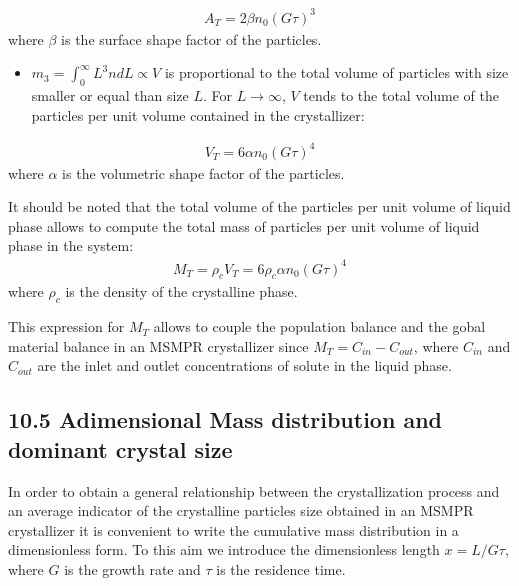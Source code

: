 \documentclass[letterpaper,10pt,english]{jupyterBook}
\begin{document}
\begin{equation}\label{equation:MSMPR_crystallizer:MSMPReq15}
\begin{split}
A_T=2{\beta}n_0(G\tau)^3
\end{split}
\end{equation}
\sphinxAtStartPar
where \(\beta\) is the surface shape factor of the particles.
\begin{itemize}
\item {} 
\sphinxAtStartPar
\(m_3=\int_0^{\infty}L^3ndL\propto{V}\) is proportional to the total volume of particles with size smaller or equal than size \(L\). For \(L\rightarrow{\infty}\), \(V\) tends to the total volume of the particles per unit volume contained in the crystallizer:

\end{itemize}
\begin{equation}\label{equation:MSMPR_crystallizer:MSMPReq16}
\begin{split}
V_T=6{\alpha}n_0(G\tau)^4
\end{split}
\end{equation}
\sphinxAtStartPar
where \(\alpha\) is the volumetric shape factor of the particles.

\sphinxAtStartPar
It should be noted that the total volume of the particles per unit volume of liquid phase allows to compute the total mass of particles per unit volume of liquid phase in the system:
\begin{equation}\label{equation:MSMPR_crystallizer:MSMPReq17}
\begin{split}
M_T=\rho_c{V_T}=6\rho_c{\alpha}n_0(G\tau)^4
\end{split}
\end{equation}
\sphinxAtStartPar
where \(\rho_c\) is the density of the crystalline phase.

\sphinxAtStartPar
This expression for \(M_T\) allows to couple the population balance and the gobal material balance in an MSMPR crystallizer since \(M_T=C_{in}-C_{out}\), where \(C_{in}\) and \(C_{out}\) are the inlet and outlet concentrations of solute in the liquid phase.


\subsection{10.5 Adimensional Mass distribution and dominant crystal size}
\label{\detokenize{MSMPR_crystallizer:adimensional-mass-distribution-and-dominant-crystal-size}}
\sphinxAtStartPar
In order to obtain a general relationship between the crystallization process and an average indicator of the crystalline particles size obtained in an MSMPR crystallizer it is convenient to write the cumulative mass distribution in a dimensionless form. To this aim we introduce the dimensionless length \(x=L/G\tau\), where \(G\) is the growth rate and \(\tau\) is the residence time.
\end{document}
